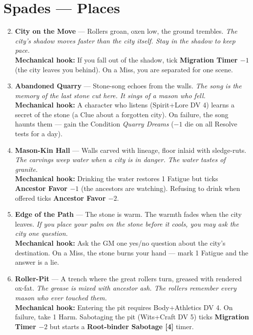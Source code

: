 \section*{Spades --- Places}
\label{sec:ngomebe-places}
\begin{enumerate}
\setcounter{enumi}{1}
\item \textbf{City on the Move} --- Rollers groan, oxen low, the ground trembles.
  \hfill \textit{The city's shadow moves faster than the city itself. Stay in the shadow to keep pace.} \\
  \textbf{Mechanical hook:} If you fall out of the shadow, tick \textbf{Migration Timer $-1$} (the city leaves you behind). On a Miss, you are separated for one scene.

\item \textbf{Abandoned Quarry} --- Stone-song echoes from the walls.
  \hfill \textit{The song is the memory of the last stone cut here. It sings of a mason who fell.} \\
  \textbf{Mechanical hook:} A character who listens (Spirit+Lore DV 4) learns a secret of the stone (a Clue about a forgotten city). On failure, the song haunts them --- gain the Condition \textit{Quarry Dreams} ($-1$ die on all Resolve tests for a day).

\item \textbf{Mason-Kin Hall} --- Walls carved with lineage, floor inlaid with sledge-ruts.
  \hfill \textit{The carvings weep water when a city is in danger. The water tastes of granite.} \\
  \textbf{Mechanical hook:} Drinking the water restores 1 Fatigue but ticks \textbf{Ancestor Favor $-1$} (the ancestors are watching). Refusing to drink when offered ticks \textbf{Ancestor Favor $-2$}.

\item \textbf{Edge of the Path} --- The stone is warm. The warmth fades when the city leaves.
  \hfill \textit{If you place your palm on the stone before it cools, you may ask the city one question.} \\
  \textbf{Mechanical hook:} Ask the GM one yes/no question about the city's destination. On a Miss, the stone burns your hand --- mark 1 Fatigue and the answer is a lie.

\item \textbf{Roller-Pit} --- A trench where the great rollers turn, greased with rendered ox-fat.
  \hfill \textit{The grease is mixed with ancestor ash. The rollers remember every mason who ever touched them.} \\
  \textbf{Mechanical hook:} Entering the pit requires Body+Athletics DV 4. On failure, take 1 Harm. Sabotaging the pit (Wits+Craft DV 5) ticks \textbf{Migration Timer $-2$} but starts a \textbf{Root-binder Sabotage [4]} timer.


\end{enumerate}
